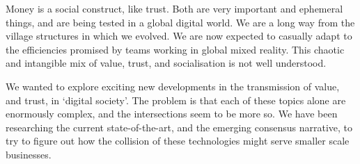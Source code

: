 Money is a social construct, like trust. Both are very important and ephemeral things, and are being tested in a global digital world.  We are a long way from the village structures in which we evolved. We are now expected to casually adapt to the efficiencies promised by teams working in global mixed reality. This chaotic and intangible mix of value, trust, and socialisation is not well understood.\par
We wanted to explore exciting new developments in the transmission of value, and trust, in `digital society'. The problem is that each of these topics alone are enormously complex, and the intersections seem to be more so. We have been researching the current state-of-the-art, and the emerging consensus narrative, to try to figure out how the collision of these technologies might serve smaller scale businesses. 


